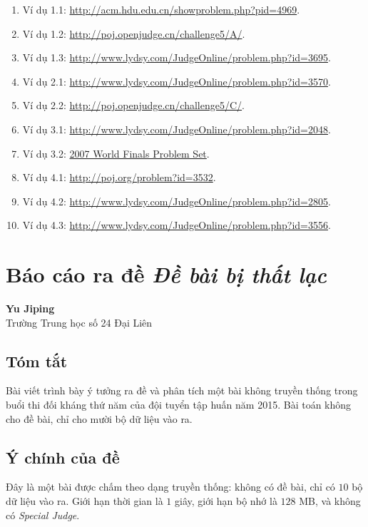 \documentclass[11pt]{article}
\begin{document}
\begin{enumerate}
  \item Ví dụ 1.1: \url{http://acm.hdu.edu.cn/showproblem.php?pid=4969}.
  \item Ví dụ 1.2: \url{http://poj.openjudge.cn/challenge5/A/}.
  \item Ví dụ 1.3: \url{http://www.lydsy.com/JudgeOnline/problem.php?id=3695}.
  \item Ví dụ 2.1: \url{http://www.lydsy.com/JudgeOnline/problem.php?id=3570}.
  \item Ví dụ 2.2: \url{http://poj.openjudge.cn/challenge5/C/}.
  \item Ví dụ 3.1: \url{http://www.lydsy.com/JudgeOnline/problem.php?id=2048}.
  \item Ví dụ 3.2:
  \href{http://icpc.baylor.edu/download/worldfinals/problems/2007WorldFinalProblemSet.pdf}{2007 World Finals Problem Set}.
  \item Ví dụ 4.1: \url{http://poj.org/problem?id=3532}.
  \item Ví dụ 4.2: \url{http://www.lydsy.com/JudgeOnline/problem.php?id=2805}.
  \item Ví dụ 4.3: \url{http://www.lydsy.com/JudgeOnline/problem.php?id=3556}.
\end{enumerate}

\section{Báo cáo ra đề \emph{Đề bài bị thất lạc}}

\begin{center}
\textbf{Yu Jiping}\\
Trường Trung học số 24 Đại Liên
\end{center}

\subsection*{Tóm tắt}

Bài viết trình bày ý tưởng ra đề và phân tích một bài không truyền thống trong
buổi thi đối kháng thứ năm của đội tuyển tập huấn năm 2015. Bài toán không cho
đề bài, chỉ cho mười bộ dữ liệu vào ra.

\subsection{Ý chính của đề}

Đây là một bài được chấm theo dạng truyền thống: không có đề bài, chỉ có
\(10\) bộ dữ liệu vào ra. Giới hạn thời gian là \(1\) giây, giới hạn bộ nhớ là
\(128\) MB, và không có \emph{Special Judge}.
\end{document}
